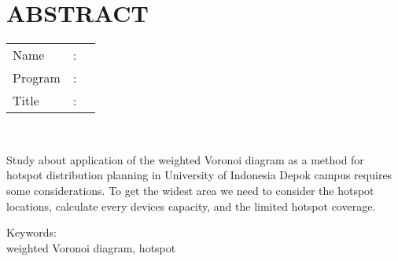%
%
%

	\chapter*{ABSTRACT}

\vspace*{0.2cm}

\noindent \begin{tabular}{l l p{11.0cm}}
	Name&: & \penulis \\
	Program&: & \programEng \\
	Title&: & \judulInggris \\
\end{tabular} \\ 

\vspace*{0.5cm}

\noindent 
Study about application of the weighted Voronoi diagram as a method for hotspot distribution planning in University of Indonesia Depok campus requires some considerations. To get the widest area we need to consider the hotspot locations, calculate every devices capacity, and the limited hotspot coverage.

\vspace*{0.2cm}

\noindent Keywords: \\ 
\noindent  
weighted Voronoi diagram, hotspot\\

\newpage